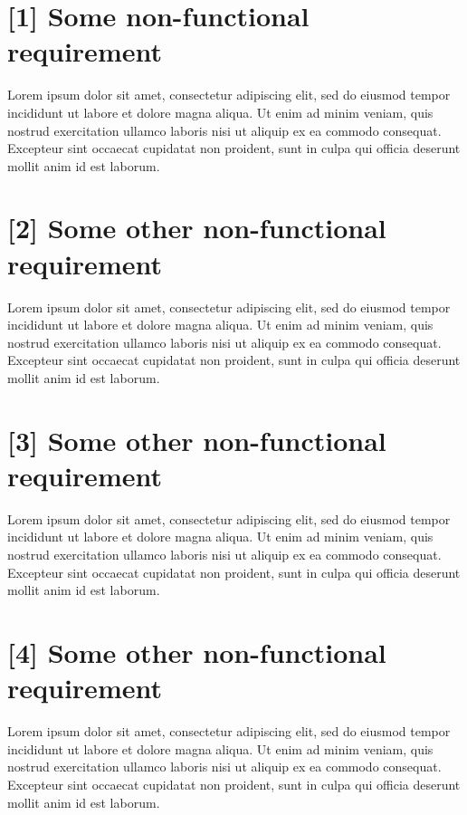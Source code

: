\section{[1] Some non-functional requirement}
Lorem ipsum dolor sit amet, consectetur adipiscing elit, sed do eiusmod tempor incididunt ut labore et dolore magna aliqua. 
Ut enim ad minim veniam, quis nostrud exercitation ullamco laboris nisi ut aliquip ex ea commodo consequat. 
Excepteur sint occaecat cupidatat non proident, sunt in culpa qui officia deserunt mollit anim id est laborum.
\section{[2] Some other non-functional requirement}
Lorem ipsum dolor sit amet, consectetur adipiscing elit, sed do eiusmod tempor incididunt ut labore et dolore magna aliqua. 
Ut enim ad minim veniam, quis nostrud exercitation ullamco laboris nisi ut aliquip ex ea commodo consequat. 
Excepteur sint occaecat cupidatat non proident, sunt in culpa qui officia deserunt mollit anim id est laborum.
\section{[3] Some other non-functional requirement}
Lorem ipsum dolor sit amet, consectetur adipiscing elit, sed do eiusmod tempor incididunt ut labore et dolore magna aliqua. 
Ut enim ad minim veniam, quis nostrud exercitation ullamco laboris nisi ut aliquip ex ea commodo consequat. 
Excepteur sint occaecat cupidatat non proident, sunt in culpa qui officia deserunt mollit anim id est laborum.
\section{[4] Some other non-functional requirement}
Lorem ipsum dolor sit amet, consectetur adipiscing elit, sed do eiusmod tempor incididunt ut labore et dolore magna aliqua. 
Ut enim ad minim veniam, quis nostrud exercitation ullamco laboris nisi ut aliquip ex ea commodo consequat.
Excepteur sint occaecat cupidatat non proident, sunt in culpa qui officia deserunt mollit anim id est laborum.
